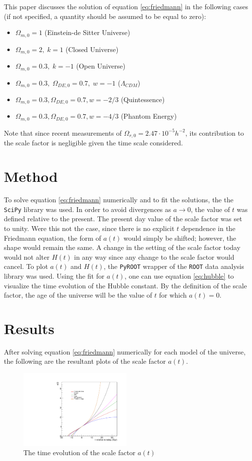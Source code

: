 \documentclass[aps,reprint,prl,floatfix]{revtex4-1}
\begin{document}
\newpage
This paper discusses the solution of equation \ref{eq:friedmann} in the following cases (if not specified, a quantity should be assumed to be equal to zero):
\begin{itemize}
\item $\Omega_{m,0}=1$ (Einstein-de Sitter Universe)
\item $\Omega_{m,0}=2,\;k=1$ (Closed Universe)
\item $\Omega_{m,0}=0.3,\;k=-1$ (Open Universe)
\item $\Omega_{m,0}=0.3,\;\Omega_{DE,0}=0.7,\;w=-1$ ($\Lambda_{CDM}$)
\item $\Omega_{m,0}=0.3,\Omega_{DE,0}=0.7,w=-2/3$ (Quintessence)
\item $\Omega_{m,0}=0.3,\Omega_{DE,0}=0.7,w=-4/3$ (Phantom Energy)
\end{itemize}
Note that since recent measurements \cite{pdg} of $\Omega_{r,0}=2.47\cdot10^{-5}h^{-2}$, its contribution to the scale factor is negligible given the time scale considered.
\section*{Method}
To solve equation \ref{eq:friedmann} numerically and to fit the solutions, the the \texttt{SciPy} library \cite{scipy} was used.  In order to avoid divergences as $a\rightarrow0$, the value of $t$ was defined relative to the present.  The present day value of the scale factor was set to unity.  Were this not the case, since there is no explicit $t$ dependence in the Friedmann equation, the form of $a(t)$ would simply be shifted; however, the shape would remain the same.  A change in the setting of the scale factor today would not alter $H(t)$ in any way since any change to the scale factor would cancel.  To plot $a(t)$ and $H(t)$, the \texttt{PyROOT} wrapper of the \texttt{ROOT} data analysis library \cite{ROOT} was used.  Using the fit for $a(t)$, one can use equation \ref{eq:hubble} to visualize the time evolution of the Hubble constant.  By the definition of the scale factor, the age of the universe will be the value of $t$ for which $a(t) = 0$.
\section*{Results}
After solving equation \ref{eq:friedmann} numerically for each model of the universe, the following are the resultant plots of the scale factor $a(t)$.

\begin{figure}[H]
\includegraphics[width=0.5\textwidth]{ps1_plots/a1-6}
\caption{The time evolution of the scale factor $a(t)$}
\end{figure}
\end{document}
